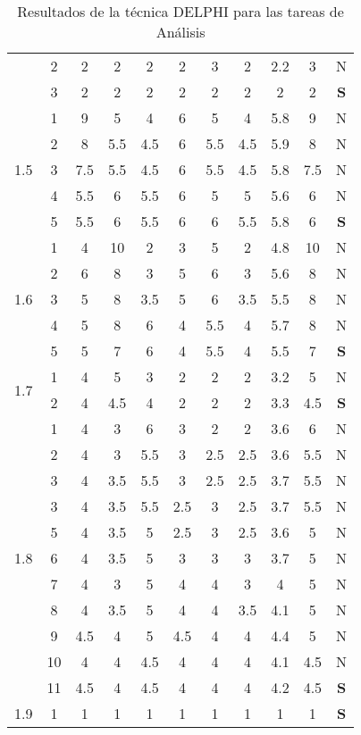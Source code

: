 \documentclass[11pt,a4paper,spanish,twoside]{report}
\begin{document}
\begin{table}[!h]
\begin{tabular}{|c|c||c|c|c|c|c||c|c|c||c|}
    & 2 & 2 & 2 & 2 & 2 & 3 & 2 & 2.2 & 3 & N \\
    & 3 & 2 & 2 & 2 & 2 & 2 & 2 & 2 & 2 & \textbf{S} \\
    \hline
    \multirow{5}{*}{1.5} & 1 & 9 & 5 & 4 & 6 & 5 & 4 & 5.8 & 9 & N \\
    & 2 & 8 & 5.5 & 4.5 & 6 & 5.5 & 4.5 & 5.9 & 8 & N \\
    & 3 & 7.5 & 5.5 & 4.5 & 6 & 5.5 & 4.5 & 5.8 & 7.5 & N \\
    & 4 & 5.5 & 6 & 5.5 & 6 & 5 & 5 & 5.6 & 6 & N \\
    & 5 & 5.5 & 6 & 5.5 & 6 & 6 & 5.5 & 5.8 & 6 & \textbf{S} \\
    \hline
    \multirow{5}{*}{1.6} & 1 & 4 & 10 & 2 & 3 & 5 & 2 & 4.8 & 10 & N \\
    & 2 & 6 & 8 & 3 & 5 & 6 & 3 & 5.6 & 8 & N \\
    & 3 & 5 & 8 & 3.5 & 5 & 6 & 3.5 & 5.5 & 8 & N \\
    & 4 & 5 & 8 & 6 & 4 & 5.5 & 4 & 5.7 & 8 & N \\
    & 5 & 5 & 7 & 6 & 4 & 5.5 & 4 & 5.5 & 7 & \textbf{S} \\
    \hline
    \multirow{2}{*}{1.7} & 1 & 4 & 5 & 3 & 2 & 2 & 2 & 3.2 & 5 & N \\
    & 2 & 4 & 4.5 & 4 & 2 & 2 & 2 & 3.3 & 4.5 & \textbf{S} \\
    \hline
    \multirow{11}{*}{1.8} & 1 & 4 & 3 & 6 & 3 & 2 & 2 & 3.6 & 6   & N \\
    & 2 & 4 & 3   & 5.5 & 3   & 2.5 & 2.5 & 3.6 & 5.5 & N \\
    & 3 & 4 & 3.5 & 5.5 & 3   & 2.5 & 2.5 & 3.7 & 5.5 & N \\
    & 3 & 4 & 3.5 & 5.5 & 2.5 & 3   & 2.5 & 3.7 & 5.5 & N \\
    & 5 & 4 & 3.5 & 5   & 2.5 & 3   & 2.5 & 3.6 & 5   & N \\
    & 6 & 4 & 3.5 & 5   & 3   & 3   & 3   & 3.7 & 5   & N \\
    & 7 & 4 & 3   & 5   & 4   & 4   & 3   & 4   & 5   & N \\
    & 8 & 4 & 3.5 & 5   & 4   & 4   & 3.5 & 4.1 & 5   & N \\
    & 9 & 4.5 & 4 & 5 & 4.5 & 4 & 4 & 4.4 & 5 & N \\
    & 10 & 4 & 4 & 4.5 & 4 & 4 & 4 & 4.1 & 4.5 & N \\
    & 11 & 4.5 & 4 & 4.5 & 4 & 4 & 4 & 4.2 & 4.5 & \textbf{S} \\
    \hline
    1.9 & 1 & 1 & 1 & 1 & 1 & 1 & 1 & 1 & 1 & \textbf{S} \\
    \hline
  \end{tabular}
  \caption{Resultados de la técnica DELPHI para las tareas de
    Análisis} \label{Tab:anal}
\end{table}
\end{document}
